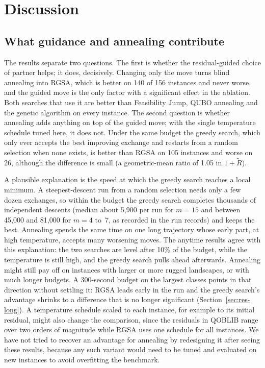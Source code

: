 \documentclass[pdflatex,sn-mathphys-num]{sn-jnl}
\theoremstyle{thmstyleone}
\theoremstyle{thmstylethree}
\begin{document}


\section{Discussion}\label{sec:discussion}

\subsection{What guidance and annealing contribute}
The results separate two questions. The first is whether the residual-guided choice of partner helps; it does, decisively. Changing only the move turns blind annealing into RGSA, which is better on 140 of 156 instances and never worse, and the guided move is the only factor with a significant effect in the ablation. Both searches that use it are better than Feasibility Jump, QUBO annealing and the genetic algorithm on every instance. The second question is whether annealing adds anything on top of the guided move; with the single temperature schedule tuned here, it does not. Under the same budget the greedy search, which only ever accepts the best improving exchange and restarts from a random selection when none exists, is better than RGSA on 105 instances and worse on 26, although the difference is small (a geometric-mean ratio of 1.05 in $1+\tilde R$).

A plausible explanation is the speed at which the greedy search reaches a local minimum. A steepest-descent run from a random selection needs only a few dozen exchanges, so within the budget the greedy search completes thousands of independent descents (median about 5{,}900 per run for $m=15$ and between 45{,}000 and 81{,}000 for $m=4$ to~7, as recorded in the run records) and keeps the best. Annealing spends the same time on one long trajectory whose early part, at high temperature, accepts many worsening moves. The anytime results agree with this explanation: the two searches are level after 10\% of the budget, while the temperature is still high, and the greedy search pulls ahead afterwards. Annealing might still pay off on instances with larger or more rugged landscapes, or with much longer budgets. A 300-second budget on the largest classes points in that direction without settling it: RGSA leads early in the run and the greedy search's advantage shrinks to a difference that is no longer significant (Section~\ref{sec:res-long}). A temperature schedule scaled to each instance, for example to its initial residual, might also change the comparison, since the residuals in QOBLIB range over two orders of magnitude while RGSA uses one schedule for all instances. We have not tried to recover an advantage for annealing by redesigning it after seeing these results, because any such variant would need to be tuned and evaluated on new instances to avoid overfitting the benchmark.
\end{document}
